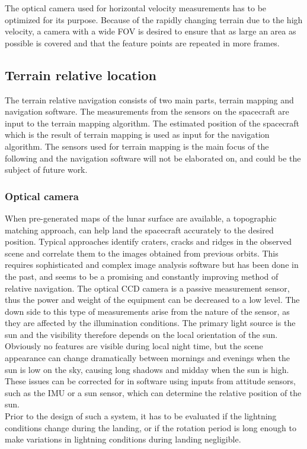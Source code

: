 The optical camera used for horizontal velocity measurements has to be optimized for its purpose. Because of the rapidly changing terrain due to the high velocity, a camera with a wide FOV is desired to ensure that as large an area as possible is covered and that the feature points are repeated in more frames.

\subsection{Terrain relative location}

The terrain relative navigation consists of two main parts, terrain mapping and navigation software.
The measurements from the sensors on the spacecraft are input to the terrain mapping algorithm. The estimated position of the spacecraft which is the result of terrain mapping is used as input for the navigation algorithm. The sensors used for terrain mapping is the main focus of the following and the navigation software will not be elaborated on, and could be the subject of future work. 

\subsubsection{Optical camera}

When pre-generated maps of the lunar surface are available, a topographic matching approach, can help land the spacecraft accurately to the desired position. Typical approaches identify craters, cracks and ridges in the observed scene and correlate them to the images obtained from previous orbits. This requires sophisticated and complex image analysis software but has been done in the past, and seems to be a promising and constantly improving method of relative navigation. The optical CCD camera is a passive measurement sensor, thus the power and weight of the equipment can be decreased to a low level. The down side to this type of measurements arise from the nature of the sensor, as they are affected by the illumination conditions. The primary light source is the sun and the visibility therefore depends on the local orientation of the sun. Obviously no features are visible during local night time, but the scene appearance can change dramatically between mornings and evenings when the sun is low on the sky, causing long shadows and midday when the sun is high. These issues can be corrected for in software using inputs from attitude sensors, such as the IMU or a sun sensor, which can determine the relative position of the sun.\\
Prior to the design of such a system, it has to be evaluated if the lightning conditions change during the landing, or if the rotation period is long enough to make variations in lightning conditions during landing negligible. 

